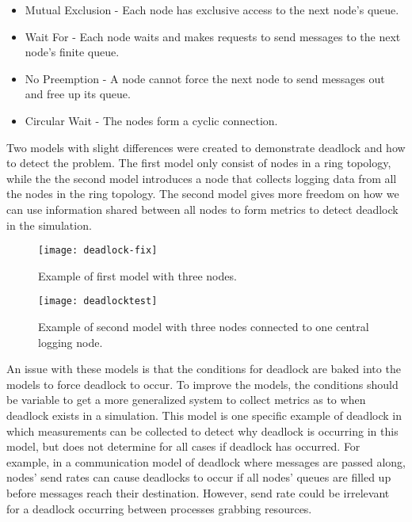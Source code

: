 \documentclass{article}
\begin{document}
\begin{itemize}
	\item Mutual Exclusion - Each node has exclusive access to the next node's queue.
	\item Wait For - Each node waits and makes requests to send messages to the next node's finite queue.
	\item No Preemption - A node cannot force the next node to send messages out and free up its queue.
	\item Circular Wait - The nodes form a cyclic connection.
\end{itemize}

Two models with slight differences were created to demonstrate deadlock and how to detect the problem. The first model only consist of nodes in a ring topology, while the the second model introduces a node that collects logging data from all the nodes in the ring topology. The second model gives more freedom on how we can use information shared between all nodes to form metrics to detect deadlock in the simulation.

\begin{figure}[H]
	\texttt{[image: deadlock-fix]}\newline
	\centering
	\caption{Example of first model with three nodes.}
	\centering
\end{figure}

\begin{figure}[H]
	\texttt{[image: deadlocktest]}\newline
	\centering
	\caption{Example of second model with three nodes connected to one central logging node.}
	\centering
\end{figure}

An issue with these models is that the conditions for deadlock are baked into the models to force deadlock to occur. To improve the models, the conditions should be variable to get a more generalized system to collect metrics as to when deadlock exists in a simulation. This model is one specific example of deadlock in which measurements can be collected to detect why deadlock is occurring in this model, but does not determine for all cases if deadlock has occurred. For example, in a communication model of deadlock where messages are passed along, nodes' send rates can cause deadlocks to occur if all nodes' queues are filled up before messages reach their destination. However, send rate could be irrelevant for a deadlock occurring between processes grabbing resources. 
\end{document}
